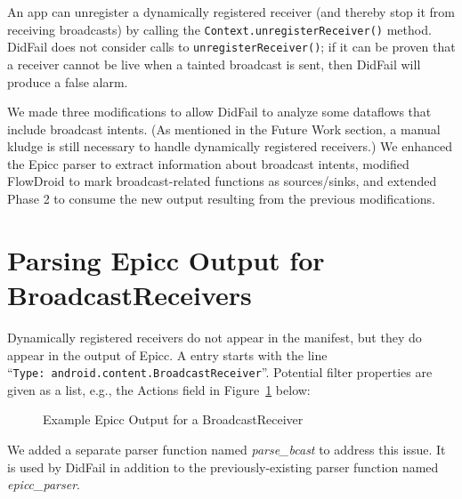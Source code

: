 An app can unregister a dynamically registered receiver (and thereby stop it from receiving broadcasts) by calling the \texttt{Context.unregisterReceiver()} method.  DidFail does not consider calls to \texttt{unregisterReceiver()}; if it can be proven that a receiver cannot be live when a tainted broadcast is sent, then DidFail will produce a false alarm.

We made three modifications to allow DidFail to analyze some dataflows that include broadcast intents. (As mentioned in the Future Work section, a manual kludge is still necessary to handle dynamically registered receivers.) We enhanced the Epicc parser to extract information about broadcast intents, modified FlowDroid to mark broadcast-related functions as sources/sinks, and extended Phase 2 to consume the new output resulting from the previous modifications.

\section{Parsing Epicc Output for BroadcastReceivers}
Dynamically registered receivers do not appear in the manifest, but they do appear in the output of Epicc.  A entry starts with the line ``\texttt{Type:\ android.content.BroadcastReceiver}''.  Potential filter properties are given as a list, e.g., the Actions field in Figure~\ref{fig:bcast_epicc_output} below:

\begin{figure}[!h]
\begin{framed}

\caption{Example Epicc Output for a BroadcastReceiver}
\label{fig:bcast_epicc_output}
\end{framed}
\end{figure}

We added a separate parser function named \emph{parse\_bcast} to address this issue. It is used by DidFail in addition to the previously-existing parser function named \emph{epicc\_parser}.

